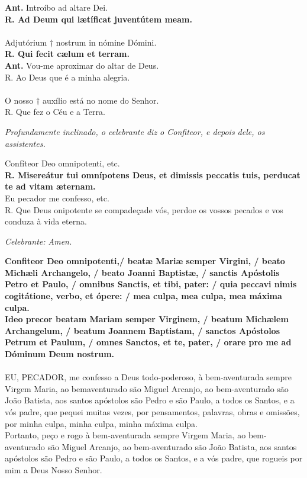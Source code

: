 \begin{multicols}{2}
\noindent \textbf{Ant.} Introíbo ad altare Dei.
\\ \textbf{R. Ad Deum qui lætíficat juventútem meam.}
\\
\\ Adjutórium $\dagger$ nostrum in nómine Dómini. 
\\ \textbf{R. Qui fecit cælum et terram.}
\\ \textbf{Ant.} Vou-me aproximar do altar de Deus.
\\ R. Ao Deus que é a minha alegria.	
\\
\\ O nosso $\dagger$ auxílio está no nome do Senhor. 
\\ R. Que fez o Céu e a Terra.
\end{multicols}
\textit{Profundamente inclinado, o celebrante diz o Confiteor, e depois dele, os assistentes.
}
\begin{multicols}{2}
\noindent Confíteor Deo omnipotenti, etc.
\\ \textbf{R. Misereátur tui omnípotens Deus, et dimissis peccatis tuis, perducat te ad vitam æternam.}
\\Eu pecador me confesso, etc. 
\\ R. Que Deus onipotente se compadeçade vós, perdoe os vossos pecados e vos conduza à vida eterna. 
\end{multicols}
	\textit{Celebrante: Amen. }
\begin{multicols}{2}
\noindent \textbf{Confiteor Deo omnipotenti,/ beatæ Mariæ semper Virgini, / beato Michæli Archangelo, / beato Joanni Baptistæ, / sanctis Apóstolis Petro et Paulo, / omnibus Sanctis, et tibi, pater: / quia peccavi nimis cogitátione, verbo, et ópere: / mea culpa, mea culpa, mea máxima culpa. 
\\ Ideo precor beatam Mariam semper Virginem, / beatum Michælem Archangelum, / beatum Joannem Baptistam, / sanctos Apóstolos Petrum et Paulum, / omnes Sanctos, et te, pater, / orare pro me ad Dóminum Deum nostrum.}
\\
\\ EU, PECADOR, me confesso a Deus todo-poderoso, à bem-aventurada sempre Virgem Maria, ao bemaventurado são Miguel Arcanjo, ao bem-aventurado são João Batista, aos santos apóstolos são Pedro e são Paulo, a todos os Santos, e a vós padre, que pequei muitas vezes, por pensamentos, palavras, obras e omissões, por minha culpa, minha culpa, minha máxima culpa. \\ Portanto, peço e rogo à bem-aventurada sempre Virgem Maria, ao bem-aventurado são Miguel Arcanjo, ao bem-aventurado são João Batista, aos santos apóstolos são Pedro e são Paulo, a todos os Santos, e a vós padre, que rogueis por mim a Deus Nosso Senhor. 
\end{multicols}

